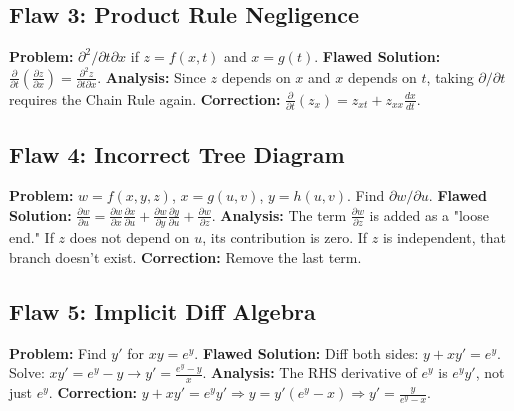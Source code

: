 \documentclass[11pt, letterpaper]{article}
\theoremstyle{definition}
\begin{document}
\subsection*{Flaw 3: Product Rule Negligence}
\textbf{Problem:} $\partial^2/\partial t \partial x$ if $z = f(x, t)$ and $x = g(t)$.
\textbf{Flawed Solution:} $\frac{\partial}{\partial t}(\frac{\partial z}{\partial x}) = \frac{\partial^2 z}{\partial t \partial x}$.
\textbf{Analysis:} Since $z$ depends on $x$ and $x$ depends on $t$, taking $\partial/\partial t$ requires the Chain Rule again.
\textbf{Correction:} $\frac{\partial}{\partial t}(z_x) = z_{xt} + z_{xx}\frac{dx}{dt}$.

\subsection*{Flaw 4: Incorrect Tree Diagram}
\textbf{Problem:} $w = f(x,y,z)$, $x=g(u,v)$, $y=h(u,v)$. Find $\partial w / \partial u$.
\textbf{Flawed Solution:} $\frac{\partial w}{\partial u} = \frac{\partial w}{\partial x}\frac{\partial x}{\partial u} + \frac{\partial w}{\partial y}\frac{\partial y}{\partial u} + \frac{\partial w}{\partial z}$.
\textbf{Analysis:} The term $\frac{\partial w}{\partial z}$ is added as a "loose end." If $z$ does not depend on $u$, its contribution is zero. If $z$ is independent, that branch doesn't exist.
\textbf{Correction:} Remove the last term.

\subsection*{Flaw 5: Implicit Diff Algebra}
\textbf{Problem:} Find $y'$ for $xy = e^y$.
\textbf{Flawed Solution:} Diff both sides: $y + xy' = e^y$. Solve: $xy' = e^y - y \to y' = \frac{e^y-y}{x}$.
\textbf{Analysis:} The RHS derivative of $e^y$ is $e^y y'$, not just $e^y$.
\textbf{Correction:} $y + xy' = e^y y' \Rightarrow y = y'(e^y - x) \Rightarrow y' = \frac{y}{e^y - x}$.
\end{document}
